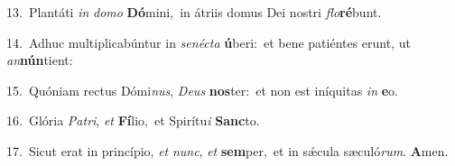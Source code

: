 {\numbfont\textcolor{\numbcolor}{13.}}~Plantáti \textit{in} \textit{do}\-\textit{mo} \textbf{Dó}\-mini,~\star in átriis domus Dei nostri \textit{flo}\-\textbf{ré}bunt.\par
{\numbfont\textcolor{\numbcolor}{14.}}~Adhuc multiplicabúntur in \textit{se}\-\textit{néc}\textit{ta} \textbf{ú}\-beri:~\star et bene patiéntes erunt, ut \textit{an}\-\textbf{nún}tient:\par
{\numbfont\textcolor{\numbcolor}{15.}}~Quóniam rectus Dómi\-\textit{nus}\-, \textit{De}\-\textit{us} \textbf{nos}\-ter:~\star et non est iníquitas \textit{in} \textbf{e}\-o.\par
{\numbfont\textcolor{\numbcolor}{16.}}~Glória \textit{Pa}\-\textit{tri}, \textit{et} \textbf{Fí}\-lio,~\star et Spirítu\textit{i} \textbf{Sanc}\-to.\par
{\numbfont\textcolor{\numbcolor}{17.}}~Sicut erat in princípio, \textit{et} \textit{nunc}\-, \textit{et} \textbf{sem}\-per,~\star et in sǽcula sæculó\-\textit{rum}\-. \textbf{A}\-men.\par
